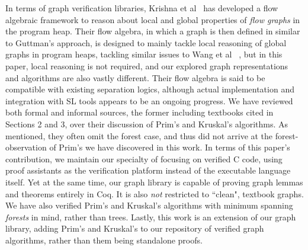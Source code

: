 \newline\newline
In terms of graph verification libraries, Krishna et al~\cite{DBLP:conf/esop/KrishnaSW20} has developed a flow algebraic framework to reason about local and global properties of \textit{flow graphs} in the program heap. Their flow algebra, in which a graph is then defined in similar to Guttman's approach, is designed to mainly tackle local reasoning of global graphs in program heaps, tackling similar issues to Wang et al ~\cite{DBLP:journals/pacmpl/WangCMH19}, but in this paper, local reasoning is not required, and our explored graph representations and algorithms are also vastly different. Their flow algebra is said to be compatible with existing separation logics, although actual implementation and integration with SL tools appears to be an ongoing progress.
\newline\newline
We have reviewed both formal and informal sources, the former including textbooks cited in Sections 2 and 3, over their discussion of Prim's and Kruskal's algorithms. As mentioned, they often omit the forest case, and thus did not arrive at the forest-observation of Prim's we have discovered in this work.
\newline\newline
In terms of this paper's contribution, we maintain our specialty of focusing on verified C code, using proof assistants as the verification platform instead of the executable language itself. Yet at the same time, our graph library is capable of proving graph lemmas and theorems entirely in Coq. It is also \textit{not} restricted to ``clean", textbook graphs. We have also verified Prim's and Kruskal's algorithms with minimum spanning \textit{forests} in mind, rather than trees. Lastly, this work is an extension of our graph library, adding Prim's and Kruskal's to our repository of verified graph algorithms, rather than them being standalone proofs.

